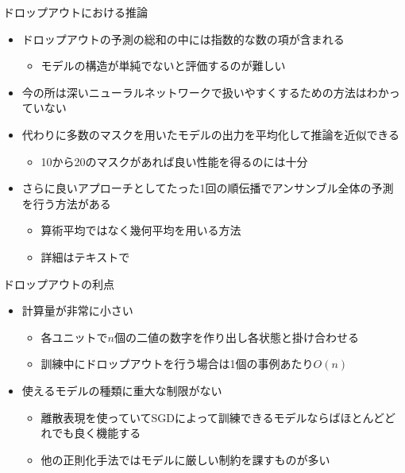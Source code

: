 \documentclass[dvipdfmx, 10pt]{beamer}
\begin{document}

\begin{frame}{ドロップアウトにおける推論}
  \begin{itemize}
    \item ドロップアウトの予測の総和の中には指数的な数の項が含まれる
    \begin{itemize}
      \item モデルの構造が単純でないと評価するのが難しい
    \end{itemize}
    \item 今の所は深いニューラルネットワークで扱いやすくするための方法はわかっていない
    \item 代わりに多数のマスクを用いたモデルの出力を平均化して推論を近似できる
      \begin{itemize}
        \item 10から20のマスクがあれば良い性能を得るのには十分
      \end{itemize}
    \item さらに良いアプローチとして\alert{たった1回の順伝播}でアンサンブル全体の予測を行う方法がある
    \begin{itemize}
      \item 算術平均ではなく幾何平均を用いる方法
      \item 詳細はテキストで
    \end{itemize}
  \end{itemize}
\end{frame}


\begin{frame}{ドロップアウトの利点}
  \begin{itemize}
    \item 計算量が非常に\alert{小さい}
    \begin{itemize}
      \item 各ユニットで$n$個の二値の数字を作り出し各状態と掛け合わせる
      \item 訓練中にドロップアウトを行う場合は1個の事例あたり$O(n)$
    \end{itemize}
    \item 使えるモデルの種類に重大な制限がない
    \begin{itemize}
      \item 離散表現を使っていてSGDによって訓練できるモデルならばほとんどどれでも良く機能する
      \item 他の正則化手法ではモデルに厳しい制約を課すものが多い
    \end{itemize}
  \end{itemize}
\end{frame}
\end{document}
